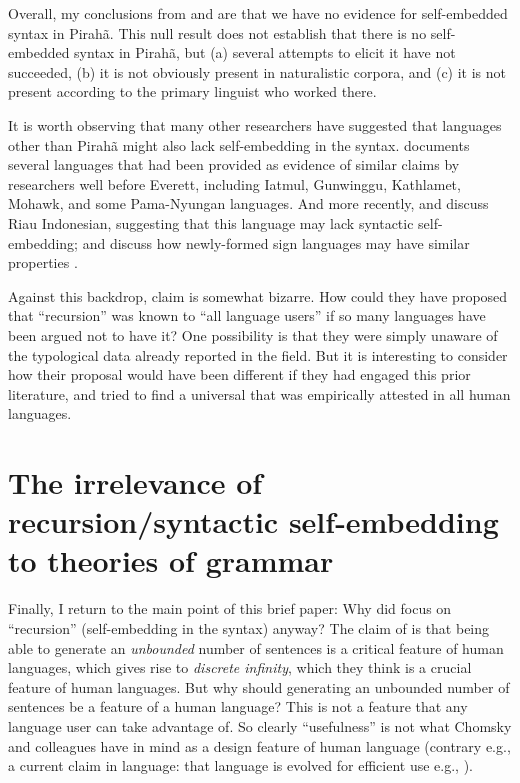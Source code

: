 \documentclass[output=paper]{langscibook}
\begin{document}
Overall, my conclusions from \citet{futrell2016corpus} and \citet{sauerland2018false} are that we have no evidence for self-embedded syntax in Pirahã. This null result does not establish that there is no self-embedded syntax in Pirahã, but (a) several attempts to elicit it have not succeeded, (b) it is not obviously present in naturalistic corpora, and (c) it is not present according to the primary linguist who worked there.

\begin{sloppypar}
It is worth observing that many other researchers have suggested that languages other than Pirahã might also lack self-embedding in the syntax.  documents several languages that had been provided as evidence of similar claims by researchers well before Everett, including Iatmul, Gunwinggu, Kathlamet, Mohawk, and some Pama-Nyungan languages. And more recently, \citet{gil2009much, jackendoff2014what} and  discuss Riau Indonesian, suggesting that this language may lack syntactic self-embedding; and \citet{jackendoff2014what} discuss how newly-formed sign languages may have similar properties \citep{goldin2005resilience, sandler2005emergence}.
\end{sloppypar}

Against this backdrop,  claim is somewhat bizarre. How could they have proposed that ``recursion'' was known to ``all language users'' if so many languages have been argued not to have it? One possibility is that they were simply unaware of the typological data already reported in the field. But it is interesting to consider how their proposal would have been different if they had engaged this prior literature, and tried to find a universal that was empirically attested in all human languages. 

\section{The irrelevance of recursion/syntactic self-embedding to theories of grammar}\largerpage
\label{irrel_recursion_sec}

Finally,  I return to the main point of this brief paper: Why did \citet{hauser2002faculty} focus on ``recursion'' (self-embedding in the syntax) anyway?  The claim of \citet{hauser2002faculty} is that being able to generate an \textit{unbounded} number of sentences is a critical feature of human languages, which gives rise to \textit{discrete infinity}, which they think is a crucial feature of human languages.  But why should generating an unbounded number of sentences be a feature of a human language?  This is not a feature that any language user can take advantage of. So clearly ``usefulness'' is not what Chomsky and colleagues have in mind as a design feature of human language (contrary e.g., a current claim in language: that language is evolved for efficient use e.g., \citealt{gibson2019efficiency}).
\end{document}
